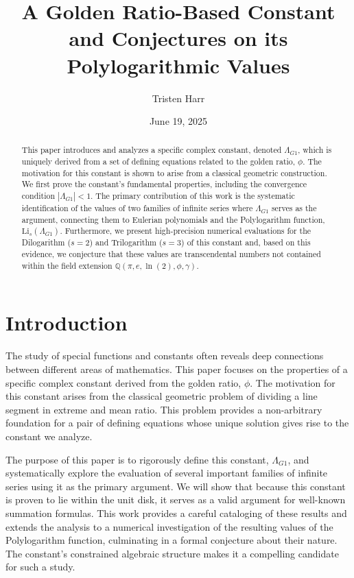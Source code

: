 \documentclass{amsart}
\theoremstyle{plain}
\theoremstyle{definition}
\theoremstyle{remark}
\newcommand{\LambdaG}{\Lambda_{G1}}
\begin{document}
\title[A Golden Ratio Constant and its Polylogarithmic Values]{A Golden Ratio-Based Constant and Conjectures on its Polylogarithmic Values}
\author{Tristen Harr}
\date{June 19, 2025}

\begin{abstract}
This paper introduces and analyzes a specific complex constant, denoted $\LambdaG$, which is uniquely derived from a set of defining equations related to the golden ratio, $\phi$. The motivation for this constant is shown to arise from a classical geometric construction. We first prove the constant's fundamental properties, including the convergence condition $|\LambdaG| < 1$. The primary contribution of this work is the systematic identification of the values of two families of infinite series where $\LambdaG$ serves as the argument, connecting them to Eulerian polynomials and the Polylogarithm function, $\mathrm{Li}_s(\LambdaG)$. Furthermore, we present high-precision numerical evaluations for the Dilogarithm ($s=2$) and Trilogarithm ($s=3$) of this constant and, based on this evidence, we conjecture that these values are transcendental numbers not contained within the field extension $\mathbb{Q}(\pi, e, \ln(2), \phi, \gamma)$.
\end{abstract}

\maketitle

\section{Introduction}
The study of special functions and constants often reveals deep connections between different areas of mathematics. This paper focuses on the properties of a specific complex constant derived from the golden ratio, $\phi$. The motivation for this constant arises from the classical geometric problem of dividing a line segment in extreme and mean ratio. This problem provides a non-arbitrary foundation for a pair of defining equations whose unique solution gives rise to the constant we analyze.

The purpose of this paper is to rigorously define this constant, $\LambdaG$, and systematically explore the evaluation of several important families of infinite series using it as the primary argument. We will show that because this constant is proven to lie within the unit disk, it serves as a valid argument for well-known summation formulas. This work provides a careful cataloging of these results and extends the analysis to a numerical investigation of the resulting values of the Polylogarithm function, culminating in a formal conjecture about their nature. The constant's constrained algebraic structure makes it a compelling candidate for such a study.
\end{document}
